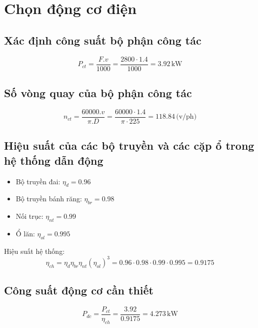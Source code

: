\chapter{Chọn động cơ điện}
\section{Xác định công suất bộ phận công tác}
\begin{equation}
    P_{ct} = \frac{F.v}{1000} = \frac{2800 \cdot 1.4}{1000} = 3.92 \, \text{kW}
\end{equation}

\section{Số vòng quay của bộ phận công tác}
\begin{equation}
    n_{ct} = \frac{60000.v}{\pi.D} = \frac{60000 \cdot 1.4}{\pi \cdot 225} = 118.84 \, \text{(v/ph)}
\end{equation}

\section{Hiệu suất của các bộ truyền và các cặp ổ trong hệ thống dẫn động}
\begin{itemize}
    \item Bộ truyền đai: $\eta_{d} = 0.96$ 
    \item Bộ truyền bánh răng: $\eta_{br} = 0.98$
    \item Nối trục: $\eta_{nt} = 0.99$
    \item Ổ lăn: $\eta_{ol} = 0.995$
\end{itemize}
Hiệu suất hệ thống:
\begin{equation}
    \eta _{ch} = \eta_{d}\eta_{br}\eta_{nt}(\eta_{ol})^3 = 0.96 \cdot 0.98 \cdot 0.99 \cdot 0.995 = 0.9175
\end{equation}

\section{Công suất động cơ cần thiết}
\begin{equation}
    P_{dc} = \frac{P_{ct}}{\eta_{ch}} = \frac{3.92}{0.9175} = 4.273 \, \text{kW}
\end{equation}

